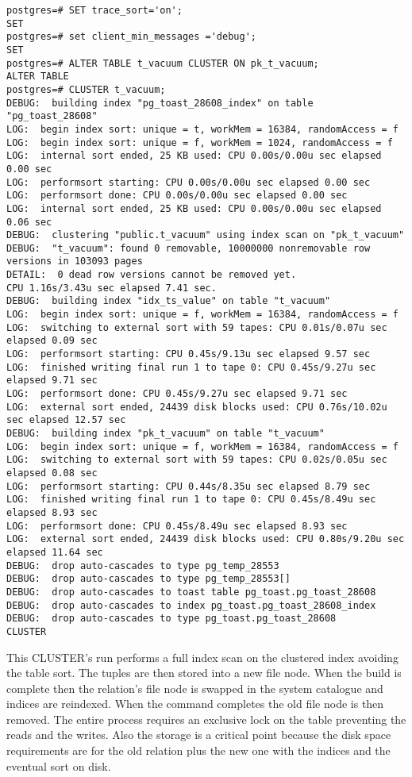 \begin{lstlisting}[style=pgsql]
postgres=# SET trace_sort='on';
SET
postgres=# set client_min_messages ='debug';
SET
postgres=# ALTER TABLE t_vacuum CLUSTER ON pk_t_vacuum;
ALTER TABLE
postgres=# CLUSTER t_vacuum;
DEBUG:  building index "pg_toast_28608_index" on table "pg_toast_28608"
LOG:  begin index sort: unique = t, workMem = 16384, randomAccess = f
LOG:  begin index sort: unique = f, workMem = 1024, randomAccess = f
LOG:  internal sort ended, 25 KB used: CPU 0.00s/0.00u sec elapsed 0.00 sec
LOG:  performsort starting: CPU 0.00s/0.00u sec elapsed 0.00 sec
LOG:  performsort done: CPU 0.00s/0.00u sec elapsed 0.00 sec
LOG:  internal sort ended, 25 KB used: CPU 0.00s/0.00u sec elapsed 0.06 sec
DEBUG:  clustering "public.t_vacuum" using index scan on "pk_t_vacuum"
DEBUG:  "t_vacuum": found 0 removable, 10000000 nonremovable row versions in 103093 pages
DETAIL:  0 dead row versions cannot be removed yet.
CPU 1.16s/3.43u sec elapsed 7.41 sec.
DEBUG:  building index "idx_ts_value" on table "t_vacuum"
LOG:  begin index sort: unique = f, workMem = 16384, randomAccess = f
LOG:  switching to external sort with 59 tapes: CPU 0.01s/0.07u sec elapsed 0.09 sec
LOG:  performsort starting: CPU 0.45s/9.13u sec elapsed 9.57 sec
LOG:  finished writing final run 1 to tape 0: CPU 0.45s/9.27u sec elapsed 9.71 sec
LOG:  performsort done: CPU 0.45s/9.27u sec elapsed 9.71 sec
LOG:  external sort ended, 24439 disk blocks used: CPU 0.76s/10.02u sec elapsed 12.57 sec
DEBUG:  building index "pk_t_vacuum" on table "t_vacuum"
LOG:  begin index sort: unique = f, workMem = 16384, randomAccess = f
LOG:  switching to external sort with 59 tapes: CPU 0.02s/0.05u sec elapsed 0.08 sec
LOG:  performsort starting: CPU 0.44s/8.35u sec elapsed 8.79 sec
LOG:  finished writing final run 1 to tape 0: CPU 0.45s/8.49u sec elapsed 8.93 sec
LOG:  performsort done: CPU 0.45s/8.49u sec elapsed 8.93 sec
LOG:  external sort ended, 24439 disk blocks used: CPU 0.80s/9.20u sec elapsed 11.64 sec
DEBUG:  drop auto-cascades to type pg_temp_28553
DEBUG:  drop auto-cascades to type pg_temp_28553[]
DEBUG:  drop auto-cascades to toast table pg_toast.pg_toast_28608
DEBUG:  drop auto-cascades to index pg_toast.pg_toast_28608_index
DEBUG:  drop auto-cascades to type pg_toast.pg_toast_28608
CLUSTER

\end{lstlisting}

This CLUSTER's run performs a full index scan on the clustered index avoiding the table sort. The 
tuples are then stored into a new file node. When the build is complete then the relation's file 
node is swapped in the system catalogue and indices are reindexed. When the command completes the 
old file node is then removed. The entire process requires an exclusive lock on the table preventing 
the reads and the writes. Also the storage is a critical point because the disk space 
requirements are for the old relation plus the new one with the indices and the eventual sort on 
disk.\newline

